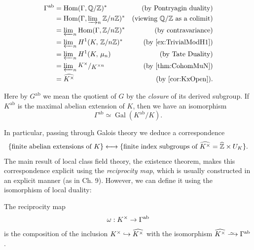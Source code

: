 \documentclass[a4paper, oneside]{memoir}
\begin{document}
\begin{align*}
	\Gamma^{\text{ab}} & = \Hom(\Gamma, \Q/\Z)^*                                    & \text{(by Pontryagin duality)}        \\
	                   & = \Hom(\Gamma, \varinjlim_n\nolimits \Zn)^*                & \text{(viewing $\Q/\Z$ as a colimit)} \\
	                   & = \varprojlim_n\nolimits \Hom(\Gamma, \Zn)^*               & \text{(by contravariance)}            \\
	                   & = \varprojlim_n\nolimits \H{1}{K}{\Zn}^*                   & \text{(by \ref{ex:TrivialModH1})}     \\
	                   & = \varprojlim_n\nolimits \H{1}{K}{\mu_n}                   & \text{(by Tate Duality)}              \\
	                   & = \varprojlim_n\nolimits \sfrac{K^{\times}}{\K^{\times n}} & \text{(by \ref{thm:CohomMuN})}        \\
	                   & = \widehat{\K^\times}                                      & \text{(by \ref{cor:KxOpen})}.
\end{align*}

\begin{remark}
	Here by $G^{\text{ab}}$ we mean the quotient of $G$ by the \textit{closure} of its derived subgroup. If $K^{\text{ab}}$ is the maximal abelian extension of $K$, then we have an isomorphism
	\[
		\Gamma^{\text{ab}} \simeq \operatorname{Gal}(K^{\text{ab}}/K).
	\]
\end{remark}
In particular, passing through Galois theory we deduce a correspondence
\begin{equation}\label{eq:ClassField}
	\{\text{finite abelian extensions of }K\} \longleftrightarrow \{\text{finite index subgroups of }\widehat{K^\times} = \widehat{\mathbb{Z}} \times U_K\}
	.\end{equation}
The main result of local class field theory, the existence theorem, makes this correspondence explicit using the \textit{reciprocity map}, which is usually constructed in an explicit manner (as in \cite{Harari} Ch. 9). However, we can define it using the isomorphism of local duality:

\begin{definition}
	The reciprocity map
	\[
		\omega:K^\times \to \Gamma^{\text{ab}}
	\]
	is the composition of the inclusion $K^\times \hookrightarrow \widehat{K^\times}$ with the isomorphism $\widehat{\K^\times} \Iso \Gamma^{\text{ab}}$.
\end{definition}
\end{document}
